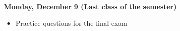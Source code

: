 \documentclass[11pt]{article}
\begin{document}
\vspace{5mm}
\noindent\textbf{\large Monday, December 9 (Last class of the semester)} 	


\begin{itemize}
\item Practice questions for the final exam
\end{itemize}

\vspace{5mm}



%
%
%
%
%
%
%
%
\end{document}
